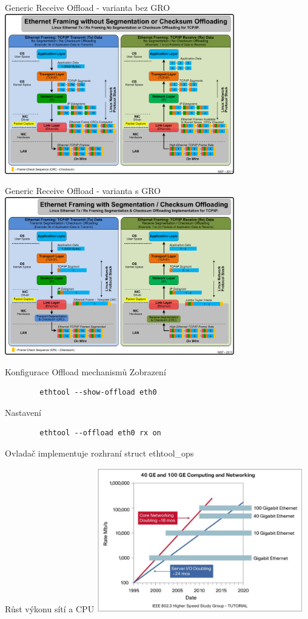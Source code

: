 \documentclass{beamer}
\begin{document}
\begin{frame}{Generic Receive Offload - varianta bez GRO}
	\centering
	\includegraphics[width=10cm,keepaspectratio]{fig/no_segmentation_offloading.png}
\end{frame}

\begin{frame}{Generic Receive Offload - varianta s GRO}
	\centering
	\includegraphics[width=10cm,keepaspectratio]{fig/segmentation_offloading.png}
\end{frame}

\begin{frame}[fragile]{Konfigurace Offload mechanismů}
	Zobrazení
	\begin{lstlisting}
		ethtool --show-offload eth0
	\end{lstlisting}
	Nastavení
	\begin{lstlisting}
		ethtool --offload eth0 rx on
	\end{lstlisting}
	Ovladač implementuje rozhraní struct ethtool\_ops
\end{frame}

\begin{frame}{Růst výkonu sítí a CPU}
	\centering
	\includegraphics[width=9cm,keepaspectratio]{fig/performance-gap.png}
\end{frame}
\end{document}

